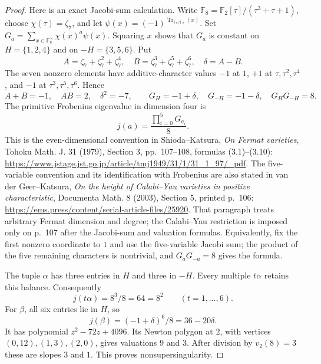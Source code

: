 \documentclass[11pt]{article}
\theoremstyle{remark}\newtheorem{remark}[theorem]{Remark}
\begin{document}
\begin{proof}
Here is an exact Jacobi-sum calculation. Write
\(\mathbb F _8=\mathbb F _2[\tau]/(\tau^3+\tau+1)\), choose
\(\chi(\tau)=\zeta _7\), and let
\(\psi(x)=(-1)^{\operatorname{Tr}_{\mathbb F _8/\mathbb F _2}(x)}\).
Set \(G_a=\sum_{x\in\mathbb F _8^\times}\chi(x)^a\psi(x)\).
Squaring \(x\) shows that \(G_a\) is constant on
\(H=\{1,2,4\}\) and on \(-H=\{3,5,6\}\). Put
\[
 A=\zeta _7+\zeta _7^2+\zeta _7^4,\quad
 B=\zeta _7^3+\zeta _7^5+\zeta _7^6,\quad \delta=A-B.
\]
The seven nonzero elements have additive-character values \(-1\) at
\(1\), \(+1\) at \(\tau,\tau^2,\tau^4\), and \(-1\) at
\(\tau^3,\tau^5,\tau^6\). Hence
\[
 A+B=-1,\quad AB=2,\quad \delta^2=-7,\qquad
 G_H=-1+\delta,\quad G_{-H}=-1-\delta,\quad G_HG_{-H}=8.
\]
The primitive Frobenius eigenvalue in dimension four is
\[
 j(a)=\frac{\prod_{i=0}^5G_{a_i}}8.
\]
This is the even-dimensional convention in Shioda--Katsura,
\emph{On Fermat varieties}, Tohoku Math. J. 31 (1979),
Section 3, pp.~107--108, formulas (3.1)--(3.10):
\url{https://www.jstage.jst.go.jp/article/tmj1949/31/1/31_1_97/_pdf}.
The five-variable convention and its identification with Frobenius
are also stated in van der Geer--Katsura,
\emph{On the height of Calabi--Yau varieties in positive characteristic},
Documenta Math. 8 (2003), Section 5, printed p.~106:
\url{https://ems.press/content/serial-article-files/25920}.
That paragraph treats arbitrary Fermat dimension and degree; the
Calabi--Yau restriction is imposed only on p.~107 after the Jacobi-sum
and valuation formulas. Equivalently, fix the first nonzero coordinate
to \(1\) and use the five-variable Jacobi sum; the product of the five
remaining characters is nontrivial, and \(G_aG_{-a}=8\) gives the formula.

The tuple \(\alpha\) has three entries in \(H\) and three in \(-H\).
Every multiple \(t\alpha\) retains this balance. Consequently
\[
 j(t\alpha)=8^3/8=64=8^2\qquad(t=1,\ldots,6).
\]
For \(\beta\), all six entries lie in \(H\), so
\[
 j(\beta)=(-1+\delta)^6/8=36-20\delta.
\]
It has polynomial \(z^2-72z+4096\). Its Newton polygon at \(2\), with
vertices \((0,12),(1,3),(2,0)\), gives valuations \(9\) and \(3\).
After division by \(v_2(8)=3\) these are slopes \(3\) and \(1\).
This proves nonsupersingularity.


\end{proof}
\end{document}
